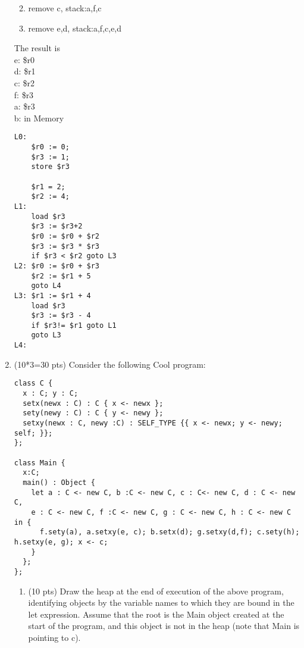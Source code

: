 \documentclass[10pt]{article}
\begin{document}
\begin{enumerate}
\begin{enumerate}
\begin{center}
\begin{tikzpicture}[shorten >=1pt,node distance=2cm,on grid,auto]
\end{tikzpicture}\end{center}

\item  remove c, stack:a,f,c
\begin{center}\end{center}

\item remove e,d, stack:a,f,c,e,d

\end{enumerate}
The result is \\
e: \$r0 \\
d: \$r1 \\
c: \$r2 \\
f: \$r3 \\
a: \$r3 \\
b: in Memory

\begin{verbatim}
L0: 
    $r0 := 0;
    $r3 := 1;
    store $r3
   
    $r1 = 2;
    $r2 := 4;
L1: 
    load $r3
    $r3 := $r3+2
    $r0 := $r0 + $r2
    $r3 := $r3 * $r3
    if $r3 < $r2 goto L3
L2: $r0 := $r0 + $r3
    $r2 := $r1 + 5
    goto L4
L3: $r1 := $r1 + 4
    load $r3
    $r3 := $r3 - 4
    if $r3!= $r1 goto L1
    goto L3
L4:
\end{verbatim}


\item (10*3=30 pts) Consider the following Cool program:

\begin{verbatim}
class C {
  x : C; y : C;
  setx(newx : C) : C { x <- newx };
  sety(newy : C) : C { y <- newy };
  setxy(newx : C, newy :C) : SELF_TYPE {{ x <- newx; y <- newy; self; }};
};

class Main {
  x:C;
  main() : Object {
    let a : C <- new C, b :C <- new C, c : C<- new C, d : C <- new C,
    e : C <- new C, f :C <- new C, g : C <- new C, h : C <- new C in {
      f.sety(a), a.setxy(e, c); b.setx(d); g.setxy(d,f); c.sety(h); h.setxy(e, g); x <- c;
    }
  };
};
\end{verbatim}
\begin{enumerate}
  \item (10 pts) Draw the heap at the end of execution of the above program, identifying objects by the variable names to which they are bound in the let expression. Assume that the root is the Main object created at the start of the program, and this object is not in the heap (note that Main is pointing to c).
%




\end{enumerate}
\end{enumerate}
\end{document}
